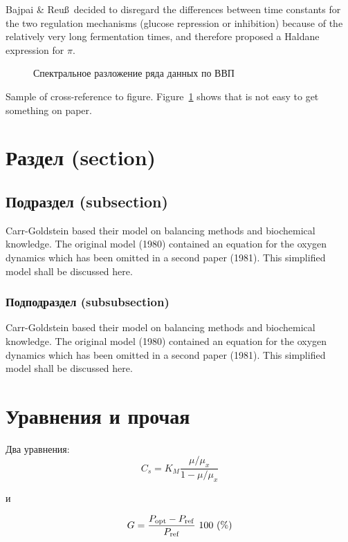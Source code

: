 \documentclass[final,pdftex]{epsilonj}
\numberwithin{equation}{section}
\begin{document}
Bajpai \& Reu\ss\ decided to disregard the
differences between time constants for the two regulation mechanisms
(glucose repression or inhibition) because of the
relatively very long fermentation times, and therefore proposed a Haldane
expression for $\pi$.


\begin{figure} \centering
{}
\caption{Спектральное разложение ряда данных по ВВП}
\label{penG}
\end{figure}

Sample of cross-reference to figure.
Figure~\ref{penG} shows that is not easy to get something on paper.



\section{Раздел (section)}

\subsection{Подраздел (subsection)}
Carr-Goldstein based their model on balancing methods and
biochemical know\-ledge. The original model (1980) contained an equation for the
oxygen dynamics which has been omitted in a second paper
(1981). This simplified model shall be discussed here.

\subsubsection{Подподраздел (subsubsection)}
Carr-Goldstein
based their model on balancing methods and
biochemical know\-ledge. The original model (1980) contained an equation for the
oxygen dynamics which has been omitted in a second paper
(1981). This simplified model shall be discussed here.

\section{Уравнения и прочая}

Два уравнения:
\begin{equation}
    C_{s}  =  K_{M} \frac{\mu/\mu_{x}}{1-\mu/\mu_{x}} \label{ccs}
\end{equation}

и

\begin{equation}
    G = \frac{P_{\rm opt} - P_{\rm ref}}{P_{\rm ref}} \mbox{\ }100 \mbox{\ }(\%)
\end{equation}
\end{document}
